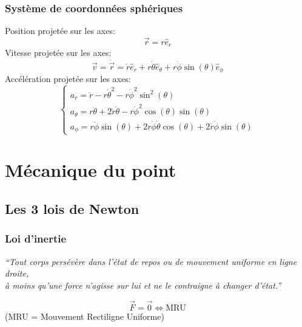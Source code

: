 \documentclass{article}
\begin{document}
\subsubsection{Système de coordonnées sphériques}
Position projetée sur les axes:
\begin{equation}
	\vec r = r \hat e_r
\end{equation}
Vitesse projetée sur les axes:
\begin{equation}
	\vec v = \dot{\vec r} = \dot r \hat e_r + r \dot \theta \hat e_\theta + r \dot \phi \sin(\theta) \hat e_\phi
\end{equation}
Accélération projetée sur les axes:
\begin{equation}
	\begin{cases}
	a_r 		= \ddot r - r \dot \theta^2 - r \dot \phi^2 \sin^2(\theta) \\
	a_\theta	= r \ddot \theta + 2 \dot r \dot \theta - r \dot \phi^2 \cos(\theta)\sin(\theta) \\
	a_\phi		= r \ddot \phi \sin(\theta) + 2r \dot \phi \dot \theta \cos(\theta) + 2 \dot r \dot \phi \sin(\theta)
	\end{cases}
\end{equation}

\section{Mécanique du point}
\subsection{Les 3 lois de Newton}
\subsubsection{Loi d'inertie}
\begin{center}
	\emph{``Tout corps persévère dans l'état de repos ou de mouvement uniforme en ligne droite, \\
	 à moins qu'une force n'agisse sur lui et ne le contraigne à changer d'état.''}
\end{center}
\begin{equation}
	\boxed{\vec F = \vec 0 \Leftrightarrow \text{MRU}}
\end{equation}
(MRU = Mouvement Rectiligne Uniforme)
\end{document}
